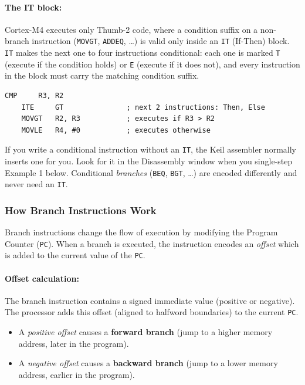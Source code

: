 \paragraph{The IT block:} Cortex-M4 executes only Thumb-2 code, where a condition suffix on a non-branch instruction (\texttt{MOVGT}, \texttt{ADDEQ}, \dots) is valid only inside an \texttt{IT} (If-Then) block. \texttt{IT} makes the next one to four instructions conditional: each one is marked \texttt{T} (execute if the condition holds) or \texttt{E} (execute if it does not), and every instruction in the block must carry the matching condition suffix.
\begin{lstlisting}[caption={Explicit IT block}]
    CMP     R3, R2
    ITE     GT               ; next 2 instructions: Then, Else
    MOVGT   R2, R3           ; executes if R3 > R2
    MOVLE   R4, #0           ; executes otherwise
\end{lstlisting}
If you write a conditional instruction without an \texttt{IT}, the Keil assembler normally inserts one for you. Look for it in the Disassembly window when you single-step Example 1 below. Conditional \emph{branches} (\texttt{BEQ}, \texttt{BGT}, \dots) are encoded differently and never need an \texttt{IT}.

\subsubsection{How Branch Instructions Work}

Branch instructions change the flow of execution by modifying the Program Counter (\texttt{PC}). 
When a branch is executed, the instruction encodes an \emph{offset} which is added to the current value of the \texttt{PC}.

\paragraph{Offset calculation:}  
The branch instruction contains a signed immediate value (positive or negative).  
The processor adds this offset (aligned to halfword boundaries) to the current \texttt{PC}.  
\begin{itemize}
    \item A \emph{positive offset} causes a \textbf{forward branch} (jump to a higher memory address, later in the program).  
    \item A \emph{negative offset} causes a \textbf{backward branch} (jump to a lower memory address, earlier in the program).  
\end{itemize} 

